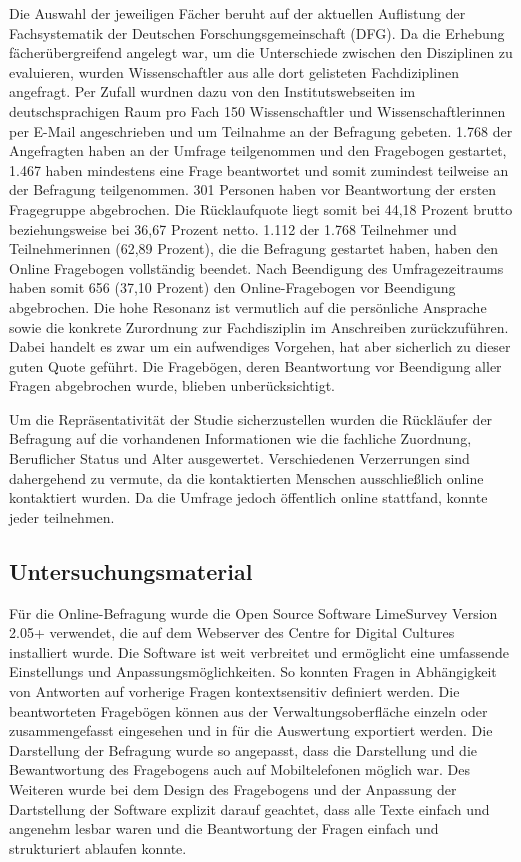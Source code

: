 Die Auswahl der jeweiligen Fächer beruht auf der aktuellen Auflistung der Fachsystematik der Deutschen Forschungsgemeinschaft (DFG). Da die Erhebung fächerübergreifend angelegt war, um die Unterschiede zwischen den Disziplinen zu evaluieren, wurden Wissenschaftler aus alle dort gelisteten Fachdiziplinen angefragt. Per Zufall wurdnen dazu von den Institutswebseiten im deutschsprachigen Raum pro Fach 150 Wissenschaftler und Wissenschaftlerinnen per E-Mail angeschrieben und um Teilnahme an der Befragung gebeten. 1.768 der Angefragten haben an der Umfrage teilgenommen und den Fragebogen gestartet, 1.467 haben mindestens eine Frage beantwortet und somit zumindest teilweise an der Befragung teilgenommen. 301 Personen haben vor Beantwortung der ersten Fragegruppe abgebrochen. Die Rücklaufquote liegt somit bei 44,18 Prozent brutto beziehungsweise bei 36,67 Prozent netto. 1.112 der 1.768 Teilnehmer und Teilnehmerinnen (62,89 Prozent), die die Befragung gestartet haben, haben den Online Fragebogen vollständig beendet. Nach Beendigung des Umfragezeitraums haben somit 656 (37,10 Prozent) den Online-Fragebogen vor Beendigung abgebrochen. Die hohe Resonanz ist vermutlich auf die persönliche Ansprache sowie die konkrete Zurordnung zur Fachdisziplin im Anschreiben zurückzuführen. Dabei handelt es zwar um ein aufwendiges Vorgehen, hat aber sicherlich zu dieser guten Quote geführt. Die Fragebögen, deren Beantwortung vor Beendigung aller Fragen abgebrochen wurde, blieben unberücksichtigt. 

Um die Repräsentativität der Studie sicherzustellen wurden die Rückläufer der Befragung auf die vorhandenen Informationen wie die fachliche Zuordnung, Beruflicher Status und Alter ausgewertet. Verschiedenen Verzerrungen sind dahergehend zu vermute, da die kontaktierten Menschen ausschließlich online kontaktiert wurden. Da die Umfrage jedoch öffentlich online stattfand, konnte jeder teilnehmen.

\subsection{Untersuchungsmaterial}

Für die Online-Befragung wurde die Open Source Software LimeSurvey Version 2.05+ verwendet, die auf dem Webserver des Centre for Digital Cultures installiert wurde. Die Software ist weit verbreitet und ermöglicht eine umfassende Einstellungs und Anpassungsmöglichkeiten. So konnten Fragen in Abhängigkeit von Antworten auf vorherige Fragen kontextsensitiv definiert werden. Die beantworteten Fragebögen können aus der Verwaltungsoberfläche einzeln oder zusammengefasst eingesehen und in für die Auswertung exportiert werden. Die Darstellung der Befragung wurde so angepasst, dass die Darstellung und die Bewantwortung des Fragebogens auch auf Mobiltelefonen möglich war. Des Weiteren wurde bei dem Design des Fragebogens und der Anpassung der Dartstellung der Software explizit darauf geachtet, dass alle Texte einfach und angenehm lesbar waren und die Beantwortung der Fragen einfach und strukturiert ablaufen konnte.

